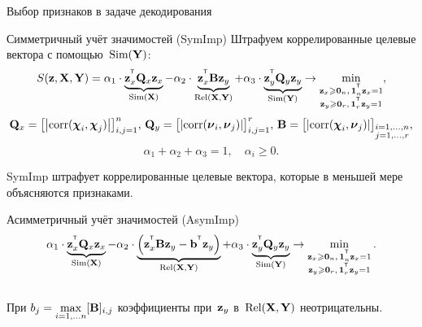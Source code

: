 \documentclass[10pt]{beamer}
\begin{document}
\begin{frame}{Выбор признаков в задаче декодирования}
	\begin{block}{Симметричный учёт значимостей (SymImp)}
	Штрафуем коррелированные целевые вектора с помощью~$\text{Sim} (\bY)$:
	\[
	S(\bz, \bX, \bY) = \alpha_1 \cdot \underbrace{\bz_x^{\T} \bQ_x \bz_x}_{\text{Sim}(\bX)} - \alpha_2 \cdot \underbrace{\bz_x^{\T} \bB \bz_y}_{\text{Rel}(\bX, \bY)} + \alpha_3 \cdot \underbrace{\bz_y^{\T} \bQ_y \bz_y}_{\text{Sim}(\bY)} \rightarrow \min_{\substack{\bz_x \geq \bZero_n, \, \bOne_n^{\T}\bz_x=1 \\ \bz_y \geq \bZero_r, \, \bOne_r^{\T}\bz_y=1}},
	\]
	\[
	\bQ_x = \bigl[ \left| \text{corr}(\bchi_i, \bchi_j) \right| \bigr]_{i,j=1}^n, \,
	\bQ_y = \bigl[ \left| \text{corr}(\bnu_i, \bnu_j) \right| \bigr]_{i,j=1}^r, \,
	\bB =  \bigl[ \left| \text{corr}(\bchi_i, \bnu_j) \right| \bigr]_{\substack{i=1, \dots, n \\ j=1, \dots, r}},
	\]
	\[
	\alpha_1 + \alpha_2 + \alpha_3 = 1, \quad \alpha_i \geq 0.
	\] 
	\end{block}
	SymImp штрафует коррелированные целевые вектора, которые в меньшей мере объясняются признаками. 
		
	\begin{block}{Асимметричный учёт значимостей (AsymImp)}
		\vspace{-0.2cm}
		\begin{equation*}
		\alpha_1 \cdot \underbrace{\bz_x^{\T} \bQ_x \bz_x}_{\text{Sim}(\bX)} - \alpha_2 \cdot  \underbrace{\left(\bz_x^{\T} \bB \bz_y - \bb^{\T} \bz_y \right) }_{\text{Rel}(\bX, \bY)} + \alpha_3 \cdot \underbrace{\bz_y^{\T} \bQ_y \bz_y}_{\text{Sim}(\bY)} \rightarrow \min_{\substack{\bz_x \geq \bZero_n, \, \bOne_n^{\T}\bz_x=1 \\ \bz_y \geq \bZero_r, \, \bOne_r^{\T}\bz_y=1}}.
		\end{equation*}
		\vspace{-0.2cm} \\
		При $b_j = \max\limits_{i=1, \dots n} [\bB]_{i, j}$ коэффициенты при~$\bz_y$ в~$\text{Rel}(\bX, \bY)$ неотрицательны.
	\end{block}
\end{frame}
\end{document}
